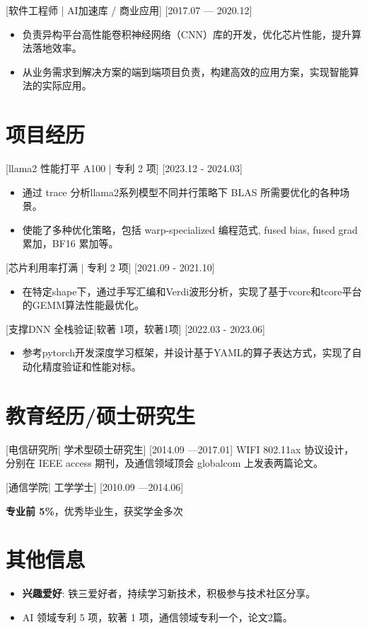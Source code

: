 \documentclass{resume}
\begin{document}
[软件工程师 | AI加速库 / 商业应用]
[2017.07 — 2020.12]
\begin{itemize}
    \item 负责异构平台高性能卷积神经网络（CNN）库的开发，优化芯片性能，提升算法落地效率。
    \item 从业务需求到解决方案的端到端项目负责，构建高效的应用方案，实现智能算法的实际应用。
\end{itemize}

\section{项目经历}

 [llama2 性能打平 A100 | 专利 2 项]
[2023.12 - 2024.03]
\begin{itemize}
    \item 通过 trace 分析llama2系列模型不同并行策略下 BLAS 所需要优化的各种场景。
    \item 使能了多种优化策略，包括 warp-specialized 编程范式, fused bias, fused grad 累加，BF16 累加等。
\end{itemize}

[芯片利用率打满 | 专利 2 项]
[2021.09 - 2021.10]
\begin{itemize}
    \item 在特定shape下，通过手写汇编和Verdi波形分析，实现了基于vcore和tcore平台的GEMM算法性能最优化。
\end{itemize}

[支撑DNN 全栈验证|软著 1项，软著1项]
[2022.03 - 2023.06]
\begin{itemize}
    \item 参考pytorch开发深度学习框架，并设计基于YAML的算子表达方式，实现了自动化精度验证和性能对标。
\end{itemize}

\section{教育经历/硕士研究生}
[\textnormal{电信研究所|}  学术型硕士研究生]
[2014.09 —2017.01]
WIFI 802.11ax 协议设计，分别在 IEEE access 期刊，及通信领域顶会 globalcom 上发表两篇论文。

\nocite{*} %



[\textnormal{通信学院|} 工学学士]
[2010.09 —2014.06]

\textbf{专业前 5\%}，优秀毕业生，获奖学金多次

\section{其他信息}
\begin{itemize}
    \item \textbf{兴趣爱好}: 铁三爱好者，持续学习新技术，积极参与技术社区分享。
    \item AI 领域专利 5 项，软著 1 项，通信领域专利一个，论文2篇。
    \printbibliography[heading={none}]
\end{itemize}
\end{document}
